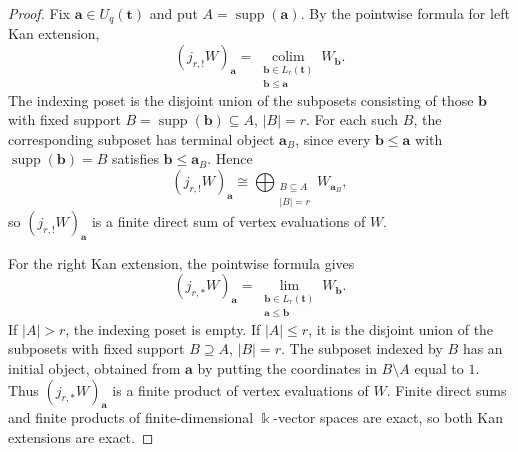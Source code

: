 \documentclass[12pt,reqno]{amsart}
\theoremstyle{definition}
\theoremstyle{remark}
\begin{document}
\begin{proof}
Fix $\mathbf a\in U_q(\mathbf t)$ and put
$A=\operatorname{supp}(\mathbf a)$.  By the pointwise formula for left Kan
extension,
\[
(j_{r,!}W)_{\mathbf a}
=
\operatorname*{colim}_{\substack{\mathbf b\in L_r(\mathbf t)\\
\mathbf b\le\mathbf a}} W_{\mathbf b}.
\]
The indexing poset is the disjoint union of the subposets consisting of those
$\mathbf b$ with fixed support
$B=\operatorname{supp}(\mathbf b)\subseteq A$, $|B|=r$.  For each such $B$,
the corresponding subposet has terminal object $\mathbf a_B$, since every
$\mathbf b\le\mathbf a$ with $\operatorname{supp}(\mathbf b)=B$ satisfies
$\mathbf b\le\mathbf a_B$.  Hence
\[
(j_{r,!}W)_{\mathbf a}
\cong
\bigoplus_{\substack{B\subseteq A\\|B|=r}} W_{\mathbf a_B},
\]
so $(j_{r,!}W)_{\mathbf a}$ is a finite direct sum of vertex evaluations of
$W$.

For the right Kan extension, the pointwise formula gives
\[
(j_{r,*}W)_{\mathbf a}
=
\operatorname*{lim}_{\substack{\mathbf b\in L_r(\mathbf t)\\
\mathbf a\le\mathbf b}} W_{\mathbf b}.
\]
If $|A|>r$, the indexing poset is empty.  If $|A|\le r$, it is the disjoint
union of the subposets with fixed support $B\supseteq A$, $|B|=r$.  The
subposet indexed by $B$ has an initial object, obtained from $\mathbf a$ by
putting the coordinates in $B\setminus A$ equal to $1$.  Thus
$(j_{r,*}W)_{\mathbf a}$ is a finite product of vertex evaluations of $W$.
Finite direct sums and finite products of finite-dimensional $\Bbbk$-vector spaces
are exact, so both Kan extensions are exact.
\end{proof}
\end{document}
